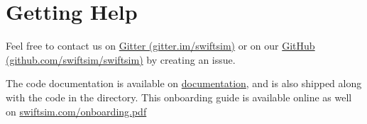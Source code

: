 \section{Getting Help}

Feel free to contact us on 
\href{https://gitter.im/swiftsim}{Gitter (gitter.im/swiftsim)} or on our
\href{https://github.com/swiftsim/swiftsim}{GitHub (github.com/swiftsim/swiftsim)} 
by creating an issue.

The code documentation is available on \href{https://swift.strw.leidenuniv.nl/docs/}{documentation},
and is also shipped along with the code in the  directory. 
This onboarding guide is available online as well on 
\href{https://swift.strw.leidenuniv.nl/onboarding.pdf}{swiftsim.com/onboarding.pdf}
